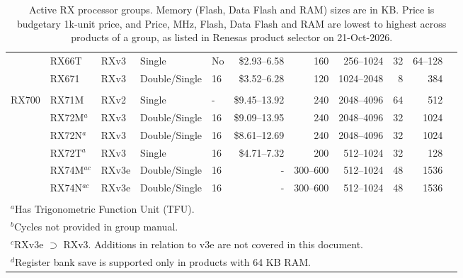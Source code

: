 \begin{table}
\begin{center}
\begin{tabular}{lllllrrrrrl}
       & RX66T          & RXv3   & Single         & No          & \$2.93--6.58     & 160      & 256--1024   & 32           & 64--128  & \cite{rx_66t}    \\
       & RX671          & RXv3   & Double/Single  & 16          & \$3.52--6.28     & 120      & 1024--2048  & 8            & 384      & \cite{rx_671}    \\
       &                &        &                &             &                  &          &             &              &          &                  \\
RX700  & RX71M          & RXv2   & Single         & -           & \$9.45--13.92    & 240      & 2048--4096  & 64           & 512      & \cite{rx_71m}    \\
       & RX72M$^{a}$    & RXv3   & Double/Single  & 16          & \$9.09--13.95    & 240      & 2048--4096  & 32           & 1024     & \cite{rx_72m}    \\
       & RX72N$^{a}$    & RXv3   & Double/Single  & 16          & \$8.61--12.69    & 240      & 2048--4096  & 32           & 1024     & \cite{rx_72n}    \\
       & RX72T$^{a}$    & RXv3   & Single         & 16          & \$4.71--7.32     & 200      & 512--1024   & 32           & 128      & \cite{rx_72t}    \\
       & RX74M$^{ac}$   & RXv3e  & Double/Single  & 16          & -                & 300--600 & 512--1024   & 48           & 1536     & \cite{rx_74m}    \\
       & RX74N$^{ac}$   & RXv3e  & Double/Single  & 16          & -                & 300--600 & 512--1024   & 48           & 1536     & \cite{rx_74n}    \\ \hline
       &                &        &                &             &                  &          &             &              &          &                  \\
\multicolumn{11}{l}{$^{a}$Has Trigonometric Function Unit (TFU).}                                                                                        \\
\multicolumn{11}{l}{$^{b}$Cycles not provided in group manual.}                                                                                          \\
\multicolumn{11}{l}{$^{c}$RXv3e $\supset$ RXv3. Additions in relation to v3e are not covered in this document.}                                          \\
\multicolumn{11}{l}{$^{d}$Register bank save is supported only in products with 64 KB RAM.}                                                              \\
\end{tabular}
\end{center}
\captionsetup{font=scriptsize, labelfont=scriptsize}
\caption{Active RX processor groups. Memory (Flash, Data Flash and RAM) sizes are in KB. Price is budgetary 
1k-unit price, and Price, MHz, Flash, Data Flash and RAM are lowest to highest across products of a group, 
as listed in Renesas product selector on 21-Oct-2026.} 
\end{table}

